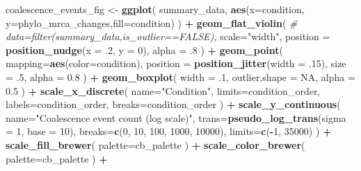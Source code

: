 \documentclass[]{book}
\newenvironment{Shaded}{\begin{snugshade}}{\end{snugshade}}
\newcommand{\CommentTok}[1]{\textcolor[rgb]{0.56,0.35,0.01}{\textit{#1}}}
\newcommand{\DataTypeTok}[1]{\textcolor[rgb]{0.13,0.29,0.53}{#1}}
\newcommand{\DecValTok}[1]{\textcolor[rgb]{0.00,0.00,0.81}{#1}}
\newcommand{\FloatTok}[1]{\textcolor[rgb]{0.00,0.00,0.81}{#1}}
\newcommand{\KeywordTok}[1]{\textcolor[rgb]{0.13,0.29,0.53}{\textbf{#1}}}
\newcommand{\NormalTok}[1]{#1}
\newcommand{\OperatorTok}[1]{\textcolor[rgb]{0.81,0.36,0.00}{\textbf{#1}}}
\newcommand{\OtherTok}[1]{\textcolor[rgb]{0.56,0.35,0.01}{#1}}
\newcommand{\StringTok}[1]{\textcolor[rgb]{0.31,0.60,0.02}{#1}}
\begin{document}
\begin{Shaded}
\begin{Highlighting}[]
{{{{\NormalTok{coalescence_events_fig <-}\StringTok{ }\KeywordTok{ggplot}\NormalTok{(}
\NormalTok{    summary_data,}
    \KeywordTok{aes}\NormalTok{(}\DataTypeTok{x=}\NormalTok{condition, }\DataTypeTok{y=}\NormalTok{phylo_mrca_changes,}\DataTypeTok{fill=}\NormalTok{condition)}
\NormalTok{  ) }\OperatorTok{+}
\StringTok{  }\KeywordTok{geom_flat_violin}\NormalTok{(}
    \CommentTok{# data=filter(summary_data,is_outlier==FALSE),}
    \DataTypeTok{scale=}\StringTok{"width"}\NormalTok{,}
    \DataTypeTok{position =} \KeywordTok{position_nudge}\NormalTok{(}\DataTypeTok{x =} \FloatTok{.2}\NormalTok{, }\DataTypeTok{y =} \DecValTok{0}\NormalTok{),}
    \DataTypeTok{alpha =} \FloatTok{.8}
\NormalTok{  ) }\OperatorTok{+}
\StringTok{  }\KeywordTok{geom_point}\NormalTok{(}
    \DataTypeTok{mapping=}\KeywordTok{aes}\NormalTok{(}\DataTypeTok{color=}\NormalTok{condition),}
    \DataTypeTok{position =} \KeywordTok{position_jitter}\NormalTok{(}\DataTypeTok{width =} \FloatTok{.15}\NormalTok{),}
    \DataTypeTok{size =} \FloatTok{.5}\NormalTok{,}
    \DataTypeTok{alpha =} \FloatTok{0.8}
\NormalTok{  ) }\OperatorTok{+}
\StringTok{  }\KeywordTok{geom_boxplot}\NormalTok{(}
    \DataTypeTok{width =} \FloatTok{.1}\NormalTok{,}
    \DataTypeTok{outlier.shape =} \OtherTok{NA}\NormalTok{,}
    \DataTypeTok{alpha =} \FloatTok{0.5}
\NormalTok{  ) }\OperatorTok{+}
\StringTok{  }\KeywordTok{scale_x_discrete}\NormalTok{(}
    \DataTypeTok{name=}\StringTok{"Condition"}\NormalTok{,}
    \DataTypeTok{limits=}\NormalTok{condition_order,}
    \DataTypeTok{labels=}\NormalTok{condition_order,}
    \DataTypeTok{breaks=}\NormalTok{condition_order}
\NormalTok{  ) }\OperatorTok{+}
\StringTok{  }\KeywordTok{scale_y_continuous}\NormalTok{(}
    \DataTypeTok{name=}\StringTok{"Coalescence event count (log scale)"}\NormalTok{,}
    \DataTypeTok{trans=}\KeywordTok{pseudo_log_trans}\NormalTok{(}\DataTypeTok{sigma =} \DecValTok{1}\NormalTok{, }\DataTypeTok{base =} \DecValTok{10}\NormalTok{),}
    \DataTypeTok{breaks=}\KeywordTok{c}\NormalTok{(}\DecValTok{0}\NormalTok{, }\DecValTok{10}\NormalTok{, }\DecValTok{100}\NormalTok{, }\DecValTok{1000}\NormalTok{, }\DecValTok{10000}\NormalTok{),}
    \DataTypeTok{limits=}\KeywordTok{c}\NormalTok{(}\OperatorTok{-}\DecValTok{1}\NormalTok{, }\DecValTok{35000}\NormalTok{)}
\NormalTok{  ) }\OperatorTok{+}
\StringTok{  }\KeywordTok{scale_fill_brewer}\NormalTok{(}
    \DataTypeTok{palette=}\NormalTok{cb_palette}
\NormalTok{  ) }\OperatorTok{+}
\StringTok{  }\KeywordTok{scale_color_brewer}\NormalTok{(}
    \DataTypeTok{palette=}\NormalTok{cb_palette}
\NormalTok{  ) }\OperatorTok{+}
}}}}
\end{Highlighting}
\end{Shaded}
\end{document}
